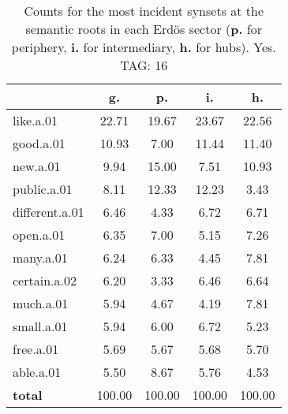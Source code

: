 \begin{table}[h!]
\begin{center}
\begin{tabular}{| l | c | c | c | c |}\hline
 & g. & p. & i. & h. \\\hline
like.a.01 & 22.71  & 19.67  & 23.67  & 22.56 \\\hline
good.a.01 & 10.93  & 7.00  & 11.44  & 11.40 \\\hline
new.a.01 & 9.94  & 15.00  & 7.51  & 10.93 \\\hline
public.a.01 & 8.11  & 12.33  & 12.23  & 3.43 \\\hline
different.a.01 & 6.46  & 4.33  & 6.72  & 6.71 \\\hline
open.a.01 & 6.35  & 7.00  & 5.15  & 7.26 \\\hline
many.a.01 & 6.24  & 6.33  & 4.45  & 7.81 \\\hline
certain.a.02 & 6.20  & 3.33  & 6.46  & 6.64 \\\hline
much.a.01 & 5.94  & 4.67  & 4.19  & 7.81 \\\hline
small.a.01 & 5.94  & 6.00  & 6.72  & 5.23 \\\hline
free.a.01 & 5.69  & 5.67  & 5.68  & 5.70 \\\hline
able.a.01 & 5.50  & 8.67  & 5.76  & 4.53 \\\hline
{{\bf total}} & 100.00  & 100.00  & 100.00  & 100.00 \\\hline
\end{tabular}
\caption{Counts for the most incident synsets at the semantic roots in each Erd\"os sector ({\bf p.} for periphery, {\bf i.} for intermediary, {\bf h.} for hubs). Yes. TAG: 16}
\end{center}
\end{table}